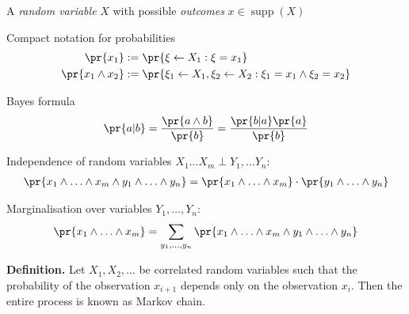 \documentclass[landscape,footrule]{foils}
\DeclareMathOperator{\supp}{supp}
\begin{document}
\titlefoil





\enlargethispage{0.9cm}
\begin{triangles}
\item A \emph{random variable} $X$ with possible \emph{outcomes} $x\in\supp(X)$
\item Compact notation for probabilities \vspace*{-1ex}
\begin{align*}
\pr{x_1}&:=\pr{\xi\gets X_1: \xi=x_1}\\
\pr{x_1\wedge x_2}&:=\pr{\xi_1\gets X_1,\xi_2\gets X_2 : \xi_1=x_1\wedge \xi_2=x_2}
\end{align*}\vspace*{-4ex}
\item Bayes formula \vspace*{-2ex}
\begin{align*}
\pr{a|b}=\frac{\pr{a\wedge b}}{\pr{b}}=\frac{\pr{b|a}\pr{a}}{\pr{b}}
\end{align*}\vspace*{-4ex}
\item Independence of random variables $X_1\ldots X_m\perp Y_1,\ldots Y_n$: \vspace*{-1ex}
\begin{align*}
 \pr{x_1\wedge\ldots\wedge x_m\wedge y_1\wedge\ldots\wedge y_n}=\pr{x_1\wedge\ldots\wedge x_m}\cdot\pr{y_1\wedge\ldots\wedge y_n}
\end{align*}\vspace*{-4ex}
\item Marginalisation over variables $Y_1,\ldots, Y_n$: \vspace*{-1ex}
\begin{align*}
 \pr{x_1\wedge\ldots\wedge x_m}=\sum_{y_1,\ldots,y_n}\pr{x_1\wedge\ldots\wedge x_m \wedge y_1\wedge\ldots\wedge y_n}
\end{align*} 
\end{triangles}



\textbf{Definition.}
Let $X_1, X_2,\ldots$ be correlated random variables such that the probability of the observation $x_{i+1}$ depends only on the observation $x_{i}$.
Then the entire process is known as Markov chain.
\end{document}
